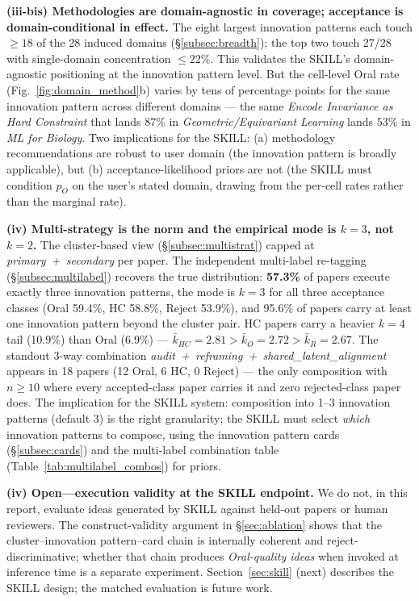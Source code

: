 \documentclass[10pt,a4paper]{article}
\begin{document}
\textbf{(iii-bis) Methodologies are domain-agnostic in coverage; acceptance is domain-conditional in effect.} The eight largest innovation patterns each touch $\geq 18$ of the 28 induced domains (\S\ref{subsec:breadth}); the top two touch 27/28 with single-domain concentration $\leq 22\%$. This validates the SKILL's domain-agnostic positioning at the innovation pattern level. But the cell-level Oral rate (Fig.~\ref{fig:domain_method}b) varies by tens of percentage points for the same innovation pattern across different domains --- the same \textit{Encode Invariance as Hard Constraint} that lands $87\%$ in \textit{Geometric/Equivariant Learning} lands $53\%$ in \textit{ML for Biology}. Two implications for the SKILL: (a) methodology recommendations are robust to user domain (the innovation pattern is broadly applicable), but (b) acceptance-likelihood priors are not (the SKILL must condition $p_O$ on the user's stated domain, drawing from the per-cell rates rather than the marginal rate).

\textbf{(iv) Multi-strategy is the norm and the empirical mode is \(k{=}3\), not \(k{=}2\).} The cluster-based view (\S\ref{subsec:multistrat}) capped at \emph{primary~+~secondary} per paper. The independent multi-label re-tagging (\S\ref{subsec:multilabel}) recovers the true distribution: \textbf{57.3\%} of papers execute exactly three innovation patterns, the mode is \(k{=}3\) for all three acceptance classes (Oral 59.4\%, HC 58.8\%, Reject 53.9\%), and 95.6\% of papers carry at least one innovation pattern beyond the cluster pair. HC papers carry a heavier \(k{=}4\) tail (10.9\%) than Oral (6.9\%) — \(\bar{k}_{HC}{=}2.81 > \bar{k}_O{=}2.72 > \bar{k}_R{=}2.67\). The standout 3-way combination \emph{audit~+~reframing~+~shared\_latent\_alignment} appears in 18 papers (12 Oral, 6 HC, 0 Reject) — the only composition with \(n \geq 10\) where every accepted-class paper carries it and zero rejected-class paper does. The implication for the SKILL system: composition into 1--3 innovation patterns (default 3) is the right granularity; the SKILL must select \emph{which} innovation patterns to compose, using the innovation pattern cards (\S\ref{subsec:cards}) and the multi-label combination table (Table~\ref{tab:multilabel_combos}) for priors.

\textbf{(iv) Open---execution validity at the SKILL endpoint.} We do not, in this report, evaluate ideas generated by SKILL against held-out papers or human reviewers. The construct-validity argument in \S\ref{sec:ablation} shows that the cluster--innovation pattern--card chain is internally coherent and reject-discriminative; whether that chain produces \emph{Oral-quality ideas} when invoked at inference time is a separate experiment. Section~\ref{sec:skill} (next) describes the SKILL design; the matched evaluation is future work.
\end{document}
